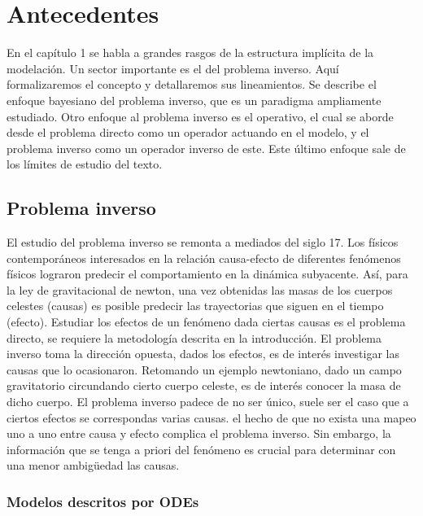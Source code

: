 
\chapter{Antecedentes}

En el capítulo 1 se habla a grandes rasgos de la estructura implícita de la modelación. Un sector importante es el del problema inverso. Aquí formalizaremos el concepto y detallaremos sus lineamientos. Se describe el enfoque bayesiano del problema inverso, que es un paradigma ampliamente estudiado. Otro enfoque al problema inverso es el operativo, el cual se aborde desde el problema directo como un operador actuando en el modelo, y el problema inverso como un operador inverso de este. Este último enfoque sale de los límites de estudio del texto. 

\section{Problema inverso}

El estudio del problema inverso se remonta a mediados del siglo 17. Los físicos contemporáneos interesados en la relación causa-efecto de diferentes fenómenos físicos lograron predecir el comportamiento en la dinámica subyacente. Así, para la ley de gravitacional de newton, una vez obtenidas las masas de los cuerpos celestes (causas) es posible predecir las trayectorias que siguen en el tiempo (efecto). Estudiar los efectos de un fenómeno dada ciertas causas es el problema directo, se requiere la metodología descrita en la introducción. El problema inverso toma la dirección opuesta, dados los efectos, es de interés investigar las causas que lo ocasionaron. Retomando un ejemplo newtoniano, dado un campo gravitatorio circundando cierto cuerpo celeste, es de interés conocer la masa de dicho cuerpo. El problema inverso padece de no ser único, suele ser el caso que a ciertos efectos se correspondas varias causas. el hecho de que no exista una mapeo uno a uno entre causa y efecto complica el problema inverso. Sin embargo, la información que se tenga a priori del fenómeno es crucial para determinar con una menor ambigüedad las causas. 

\subsection{Modelos descritos por ODEs}

